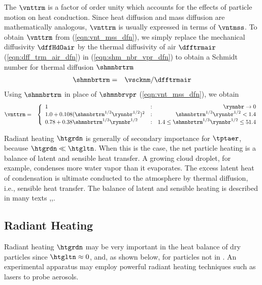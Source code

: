 \documentclass[12pt,twoside]{book}
\begin{document}
The  $\vnttrm$ is a
factor of order unity which accounts for the effects of particle
motion on heat conduction. 
Since heat diffusion and mass diffusion are mathematically analogous,  
$\vnttrm$ is usually expressed in terms of $\vntmss$.
To obtain $\vnttrm$ from (\ref{eqn:vnt_mss_dfn}), we simply 
replace the mechanical diffusivity $\dffHdOair$ by the thermal
diffusivity of air $\dfftrmair$ (\ref{eqn:dff_trm_air_dfn}) in
(\ref{eqn:shm_nbr_vpr_dfn}) to obtain a Schmidt number for thermal
diffusion $\shmnbrtrm$
\begin{eqnarray}
\shmnbrtrm & = & \vscknm / \dfftrmair
\label{eqn:shm_nbr_trm_dfn}
\end{eqnarray}
Using $\shmnbrtrm$ in place of $\shmnbrvpr$ (\ref{eqn:vnt_mss_dfn}),
we obtain
\begin{eqnarray}
\vnttrm & = & \left\{
\begin{array}{l@{\quad:\quad}r}
1
& \rynnbr \rightarrow 0 \\
1.0 + 0.108 (\shmnbrtrm^{1/3} \rynnbr^{1/2})^{2} 
& \shmnbrtrm^{1/3} \rynnbr^{1/2} < 1.4 \\
0.78 + 0.38 \shmnbrtrm^{1/3} \rynnbr^{1/2}
& 1.4 \le \shmnbrtrm^{1/3} \rynnbr^{1/2} \le 51.4
\end{array} \right.
\label{eqn:vnt_trm_dfn}
\end{eqnarray}

Radiant heating $\htgrdn$ is generally of secondary importance for
$\tptaer$, because $\htgrdn \ll \htgltn$.
When this is the case, the net particle heating is a balance 
of latent and sensible heat transfer.
A growing cloud droplet, for example, condenses more water vapor 
than it evaporates. 
The excess latent heat of condensation is ultimate conducted to the
atmosphere by thermal diffusion, i.e., sensible heat transfer.
The balance of latent and sensible heating is described in many texts  
\cite[][p.~447]{PrK78},\cite[][p.~542]{PrK98},\cite[][p.~103]{RoY94}.

\subsection{Radiant Heating}\label{sxn:rdn_htg}
Radiant heating $\htgrdn$ may be very important in the heat balance of 
dry particles since $\htgltn \approx 0$, and, as shown below, 
for particles not in .
An experimental apparatus may employ powerful radiant heating
techniques such as lasers to probe aerosols. 
\end{document}
